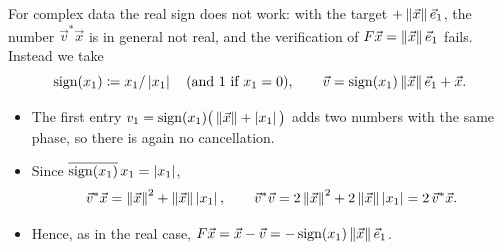 For complex data the real sign does not work: with the target $+\left\lVert \vec{x} \right\rVert\vec{e}_1$, the number $\vec{v}^\ast\vec{x}$ is in general not real, and the verification of $F\vec{x} = \left\lVert \vec{x} \right\rVert\vec{e}_1$ fails. Instead we take
\begin{equation*}
  \operatorname{sign}(x_1) \coloneqq x_1/\left\lvert x_1 \right\rvert \quad (\text{and } 1 \text{ if } x_1 = 0), \qquad \vec{v} = \operatorname{sign}(x_1)\left\lVert \vec{x} \right\rVert\vec{e}_1 + \vec{x}.
\end{equation*}
\begin{itemize}
  \item The first entry $v_1 = \operatorname{sign}(x_1)\big(\left\lVert \vec{x} \right\rVert + \left\lvert x_1 \right\rvert\big)$ adds two numbers with the same phase, so there is again no cancellation.
  \item Since $\overline{\operatorname{sign}(x_1)}\,x_1 = \left\lvert x_1 \right\rvert$,
  \begin{equation*}
    \vec{v}^\ast\vec{x} = \left\lVert \vec{x} \right\rVert^2 + \left\lVert \vec{x} \right\rVert\left\lvert x_1 \right\rvert, \qquad \vec{v}^\ast\vec{v} = 2\left\lVert \vec{x} \right\rVert^2 + 2\left\lVert \vec{x} \right\rVert\left\lvert x_1 \right\rvert = 2\,\vec{v}^\ast\vec{x}.
  \end{equation*}
  \item Hence, as in the real case, $F\vec{x} = \vec{x} - \vec{v} = -\operatorname{sign}(x_1)\left\lVert \vec{x} \right\rVert\vec{e}_1$.
\end{itemize}
